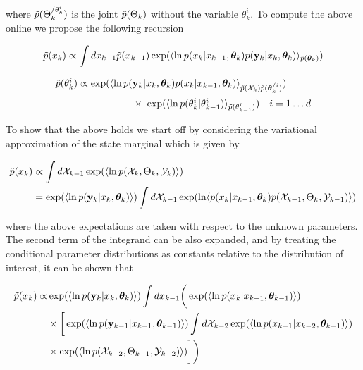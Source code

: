 \documentclass{article}
\begin{document}
 \noindent where $\tilde{p}(\Theta_{k}^{/\theta_k^i})$ is the joint $\tilde{p}(\Theta_{k})$ without the variable $\theta_k^i$. To compute the above online we propose the following recursion

 \begin{equation} \label{eq:Convenient}
\pt(x_k) \propto\displaystyle\int{ dx_{k-1}}\pt(x_{k-1})\exp(\langle\ln p(x_k| x_{k-1},\thetab_k) p(\yk | x_k,\thetab_k)\rangle_{\pt(\thetab_k)})
\end{equation}

\begin{equation} \label{eq:Convenienttheta}
\begin{array}{l}
\pt(\theta^i_k)\propto\exp(\langle \ln p(\yk|x_k,\thetab_k)p(x_k|x_{k-1},\thetab_k)\rangle_{\pt(\Xk)\pt(\thetab_k^{/i})})  \\ [2ex]
~~~~~~~~~~~~~~~~~~~~~~~~ \times~ \exp(\langle\ln p(\theta^i_k|\theta^i_{k-1})\rangle_{\pt(\theta^i_{k-1})}) ~~~ i = 1 \dots d
\end{array}
\end{equation}

To show that the above holds we start off by considering the variational approximation of the state marginal which is given by


\begin{equation} \label{eq:Statemarginalposterior}
\begin{split}
 \pt(x_k)  &\propto  \displaystyle \int d\Xkk \exp( \langle \ln p(\Xk,\Thetak,\Yk) \rangle) \\
 & = \exp( \langle \ln p(\yk|x_k,\thetab_k) \rangle ) \int d\Xkk \exp( \ln \langle p(x_k | x_{k-1}, \thetab_k) p(\Xkk, \Thetak,\Ykk) \rangle)
\end{split}
\end{equation}
\normalsize

\noindent where the above expectations are taken with respect to the unknown parameters. The second term of the integrand can be also expanded, and by treating the conditional parameter distributions as constants relative to the distribution of interest, it can be shown that

\begin{equation} \label{eq:Recursionvision}
\begin{split}
\pt(x_k) \propto & \displaystyle \exp( \langle \ln p(\yk|x_k, \thetabk) \rangle ) \int dx_{k-1}  \bigg( \exp(\langle \ln p(x_k | x_{k-1}, \thetabkk) \rangle) \\
& \times \bigg[  \exp( \langle \ln p(\ykk|x_{k-1}, \thetabkk) \rangle ) \int d\Xkkk \exp(\langle \ln  p(x_{k-1} | x_{k-2}, \thetabkk) \rangle) \\
& \times \exp(\langle \ln p(\Xkkk, \Thetakk,\Ykkk) \rangle)        \bigg]\bigg)
\end{split}
\end{equation}
\end{document}
